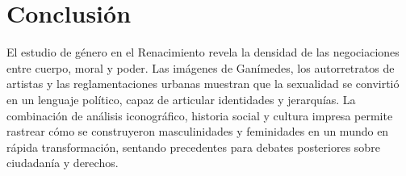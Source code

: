 \section{Conclusión}
El estudio de género en el Renacimiento revela la densidad de las negociaciones entre cuerpo, moral y poder. Las imágenes de Ganímedes, los autorretratos de artistas y las reglamentaciones urbanas muestran que la sexualidad se convirtió en un lenguaje político, capaz de articular identidades y jerarquías. La combinación de análisis iconográfico, historia social y cultura impresa permite rastrear cómo se construyeron masculinidades y feminidades en un mundo en rápida transformación, sentando precedentes para debates posteriores sobre ciudadanía y derechos.
